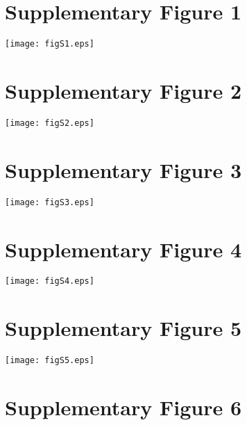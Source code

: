 \documentclass[12pt]{article}
\begin{document}
\setcounter{figure}{0}

\section*{Supplementary Figure 1}
\begin{figure*}[h]
\centerline{
	\texttt{[image: figS1.eps]}}
\end{figure*}



\newpage
\section*{Supplementary Figure 2}

\begin{figure*}[h!]
\centerline{
	\texttt{[image: figS2.eps]}}
	
\end{figure*}

\newpage
\section*{Supplementary Figure 3}

\begin{figure*}[h!]
\centerline{
	\texttt{[image: figS3.eps]}}
	
\end{figure*}


\newpage
\section*{Supplementary Figure 4}

\begin{figure*}[h!]
\centerline{
	\texttt{[image: figS4.eps]}}
	
\end{figure*}

\newpage
\section*{Supplementary Figure 5}

\begin{figure*}[h!]
\centerline{
	\texttt{[image: figS5.eps]}}
	
\end{figure*}

\newpage
\section*{Supplementary Figure 6}
\end{document}
